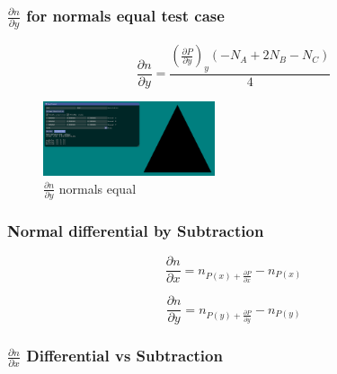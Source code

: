 \documentclass[12pt]{article}
\newcommand{\oneimgwidth}{0.45}
\newcommand{\dpdx}{\frac{\partial P}{\partial x}}
\newcommand{\dpdy}{\frac{\partial P}{\partial y}}
\newcommand{\dndx}{\frac{\partial n}{\partial x}}
\newcommand{\dndy}{\frac{\partial n}{\partial y}}
\begin{document}
\FloatBarrier

\subsubsection{$\dndy$ for normals equal test case}

\begin{equation}
\dndy = \frac{\left(\dpdy \right)_y \left(- N_A + 2 N_B - N_C \right)}{4}
\end{equation}

\begin{figure}[htbp] 
	\centering
	\includegraphics[width=\oneimgwidth\textwidth]{dn/dndy_normals_equal.png}
	\caption{$\dndy$ normals equal}
	\label{fig:dndx}
\end{figure}

\FloatBarrier

\subsubsection{Normal differential by Subtraction}

\begin{equation}
\dndx = n_{P(x) + \dpdx} - n_{P(x)}
\end{equation}

\begin{equation}
\dndy = n_{P(y) + \dpdy} - n_{P(y)}
\end{equation}

\subsubsection{$\dndx$ Differential vs Subtraction}
\end{document}
